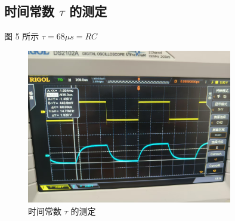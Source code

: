 \documentclass{article}
\begin{document}
\subsection{时间常数 $\tau$ 的测定}
图 5 所示 $\tau=68\mu s =RC$
\begin{figure}[h]
    \centering
    \includegraphics[width=0.8\textwidth]{RC.jpg}
    \caption{时间常数 $\tau$ 的测定}
    \label{fig:tau_measurement}
\end{figure}
\end{document}
